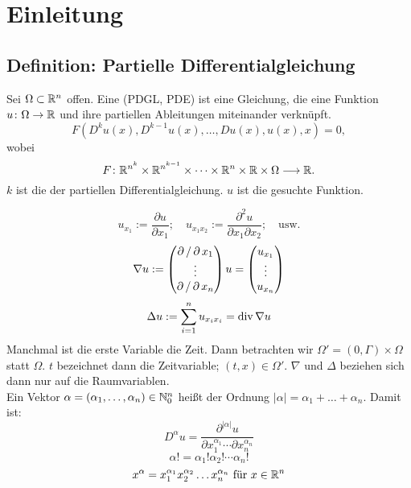 \section{Einleitung}
\label{sec:para1}
\subsection{Definition: Partielle Differentialgleichung}
\label{def_pdgl}
	Sei $\Omega \subset \mathbb{R}^n$ offen.  Eine  (PDGL, PDE) ist eine Gleichung, die eine Funktion $u\colon \Omega \rightarrow \mathbb{R}$ und ihre partiellen Ableitungen miteinander verknüpft.
	\[ F(D^k u(x), D^{k-1} u(x), \dots, Du(x),u(x),x) = 0, \]
	wobei
	\[F\colon \mathbb{R}^{n^k} \times \mathbb{R}^{n^{k-1}} \times \dots \times \mathbb{R}^n \times \mathbb{R} \times \Omega \longrightarrow \mathbb{R}. \]
	$k$ ist die  der partiellen Differentialgleichung. $u$ ist die gesuchte Funktion.
	
	\[ u_{x_1} := \frac{\partial u}{\partial x_1}; \quad u_{x_1 x_2} := \frac{\partial^2 u}{\partial x_1 \partial x_2}; \quad \text{usw.} \]
	\[ \nabla u := \begin{pmatrix} \operatorname{\partial} / \operatorname{\partial} x_1 \\ \vdots \\ \operatorname{\partial} / \operatorname{\partial} x_n \end{pmatrix} u = \begin{pmatrix} u_{x_1} \\ \vdots \\ u_{x_n} \end{pmatrix} \]
	\[ \Delta u := \sum\limits_{i=1}^{n} u_{x_i x_i} = \operatorname{div} \nabla u \]
	Manchmal ist die erste Variable die Zeit. Dann betrachten wir $\Omega' = (0,\Gamma) \times \Omega$ statt $\Omega$. $t$ bezeichnet dann die Zeitvariable; $(t,x) \in \Omega'$. $\nabla$ und $\Delta$ beziehen sich dann nur auf die Raumvariablen. \\
	Ein Vektor $\alpha = (\alpha_1,\dots,\alpha_n) \in \mathbb{N}_0^n$ heißt  der Ordnung $|\alpha| = \alpha_1+\dots+\alpha_n$. Damit ist:
	\[ D^\alpha u = \frac{\partial^{|\alpha|}u}{\partial x_1^{\alpha_1} \cdots \partial x_n^{\alpha_n}} \]
	\[ \alpha! = \alpha_1!\alpha_2!\cdots \alpha_n! \]
	\[ x^{\alpha} = x_1^{\alpha_1} x_2^{\alpha_2} \dots x_n^{\alpha_n} \text{ für } x \in \mathbb{R}^n \]
	
